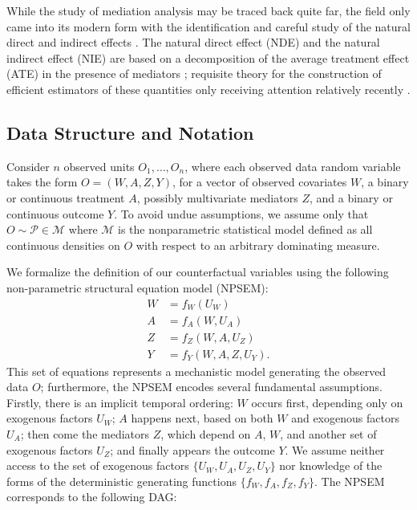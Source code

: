 \documentclass[12pt, krantz2,]{krantz}
\theoremstyle{definition}
\theoremstyle{definition}
\theoremstyle{definition}
\newcommand{\M}{\mathcal{M}}
\newcommand{\1}{\mathbbm{1}}
\begin{document}
While the study of mediation analysis may be traced back quite far, the field
only came into its modern form with the identification and careful study of the
natural direct and indirect effects \citep{robins1992identifiability, pearl2001direct}. The natural direct effect (NDE) and the natural indirect
effect (NIE) are based on a decomposition of the average treatment effect (ATE)
in the presence of mediators \citep{vanderweele2015explanation}; requisite
theory for the construction of efficient estimators of these quantities only
receiving attention relatively recently \citep{tchetgen2012semiparametric}.

\hypertarget{data-structure-and-notation-2}{%
\subsection{Data Structure and Notation}\label{data-structure-and-notation-2}}

Consider \(n\) observed units \(O_1, \ldots, O_n\), where each observed data random
variable takes the form \(O = (W, A, Z, Y)\), for a vector of observed covariates
\(W\), a binary or continuous treatment \(A\), possibly multivariate mediators \(Z\),
and a binary or continuous outcome \(Y\). To avoid undue assumptions, we assume
only that \(O \sim \mathcal{P} \in \M\) where \(\M\) is the nonparametric
statistical model defined as all continuous densities on \(O\) with respect to an
arbitrary dominating measure.

We formalize the definition of our counterfactual variables using the following
non-parametric structural equation model (NPSEM):
\begin{align}
  W &= f_W(U_W) \\
  A &= f_A(W, U_A) \\
  Z &= f_Z(W, A, U_Z) \\
  Y &= f_Y(W, A, Z, U_Y).
  \label{eq:npsem-mediate}
\end{align}
This set of equations
represents a mechanistic model generating the observed data \(O\); furthermore,
the NPSEM encodes several fundamental assumptions. Firstly, there is an implicit
temporal ordering: \(W\) occurs first, depending only on exogenous factors \(U_W\);
\(A\) happens next, based on both \(W\) and exogenous factors \(U_A\); then come the
mediators \(Z\), which depend on \(A\), \(W\), and another set of exogenous factors
\(U_Z\); and finally appears the outcome \(Y\). We assume neither access to the set
of exogenous factors \(\{U_W, U_A, U_Z, U_Y\}\) nor knowledge of the forms of the
deterministic generating functions \(\{f_W, f_A, f_Z, f_Y\}\). The NPSEM
corresponds to the following DAG:
\end{document}

